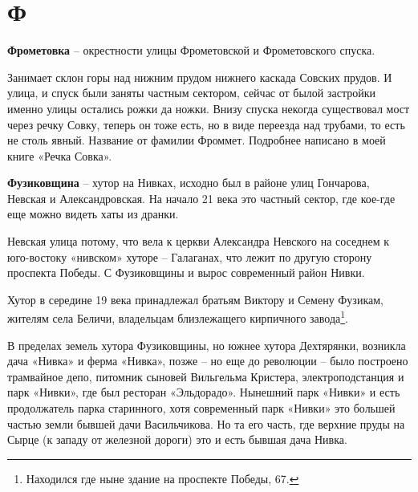 \chapter*{Ф}

\textbf{Фрометовка} – окрестности улицы Фрометовской и Фрометовского спуска.

Занимает склон горы над нижним прудом нижнего каскада Совских прудов. И улица, и спуск были заняты частным сектором, сейчас от былой застройки именно улицы остались рожки да ножки. Внизу спуска некогда существовал мост через речку Совку, теперь он тоже есть, но в виде переезда над трубами, то есть не столь явный. Название от фамилии Фроммет. Подробнее написано в моей книге «Речка Совка».\\

\medskip

\textbf{Фузиковщина} – хутор на Нивках, исходно был в районе улиц Гончарова, Невская и Александровская. На начало 21 века это частный сектор, где кое-где еще можно видеть хаты из дранки.

Невская улица потому, что вела к церкви Александра Невского на соседнем к юго-востоку «нивском» хуторе – Галаганах, что лежит по другую сторону проспекта Победы. С Фузиковщины и вырос современный район Нивки.

Хутор в середине 19 века принадлежал братьям Виктору и Семену Фузикам, жителям села Беличи, владельцам близлежащего кирпичного завода\footnote{Находился где ныне здание на проспекте Победы, 67.}. 

В пределах земель хутора Фузиковщины, но южнее хутора Дехтярянки, возникла дача «Нивка» и ферма «Нивка», позже – но еще до революции – было построено трамвайное депо, питомник сыновей Вильгельма Кристера, электроподстанция и парк «Нивки», где был ресторан «Эльдорадо». Нынешний парк «Нивки» и есть продолжатель парка старинного, хотя современный парк «Нивки» это большей частью земли бывшей дачи Васильчикова. Но та его часть, где верхние пруды на Сырце (к западу от железной дороги) это и есть бывшая дача Нивка.


